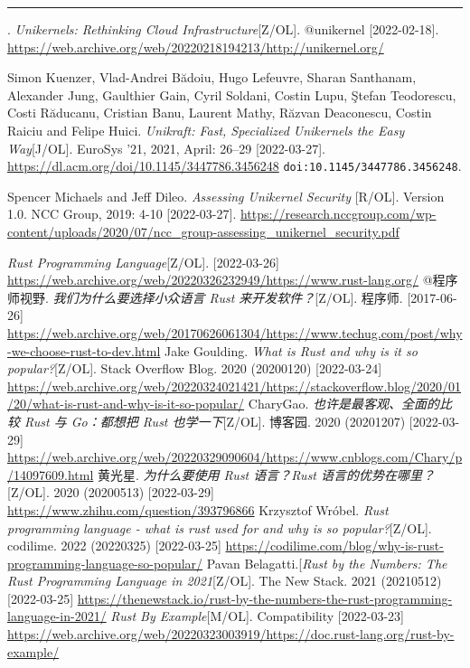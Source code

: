 \documentclass[UTF8,fontset=none,linespread=1.15]{ctexart}
\begin{document}
\begin{thebibliography}{99}
 \rule[0.5ex]{2em}{0.4pt}.
\textit{Unikernels: Rethinking Cloud Infrastructure}[Z/OL].
@unikernel [2022-02-18]. \url{https://web.archive.org/web/20220218194213/http://unikernel.org/}

 Simon Kuenzer, Vlad-Andrei Bădoiu, Hugo Lefeuvre, Sharan Santhanam,
Alexander Jung, Gaulthier Gain, Cyril Soldani, Costin Lupu, \c{S}tefan Teodorescu, Costi Răducanu,
Cristian Banu, Laurent Mathy, Răzvan Deaconescu, Costin Raiciu and Felipe Huici.
\textit{Unikraft: Fast, Specialized Unikernels the Easy Way}[J/OL]. EuroSys '21, 2021, April: 26–29
[2022-03-27]. \url{https://dl.acm.org/doi/10.1145/3447786.3456248} \texttt{doi:10.1145/3447786.3456248}.

 Spencer Michaels and Jeff Dileo. \textit{Assessing Unikernel Security
}[R/OL]. Version 1.0. NCC Group, 2019: 4-10 [2022-03-27].
\url{https://research.nccgroup.com/wp-content/uploads/2020/07/ncc_group-assessing_unikernel_security.pdf}

 \textit{Rust Programming Language}[Z/OL]. [2022-03-26] \url{https://web.archive.org/web/20220326232949/https://www.rust-lang.org/}
 @程序师视野. \textit{我们为什么要选择小众语言 Rust 来开发软件？}[Z/OL]. 程序师. [2017-06-26] \url{https://web.archive.org/web/20170626061304/https://www.techug.com/post/why-we-choose-rust-to-dev.html}
Jake Goulding. \textit{What is Rust and why is it so popular?}[Z/OL]. Stack Overflow Blog. 2020 (20200120) [2022-03-24] \url{https://web.archive.org/web/20220324021421/https://stackoverflow.blog/2020/01/20/what-is-rust-and-why-is-it-so-popular/}
 CharyGao. \textit{也许是最客观、全面的比较 Rust 与 Go：都想把 Rust 也学一下}[Z/OL]. 博客园. 2020 (20201207) [2022-03-29] \url{https://web.archive.org/web/20220329090604/https://www.cnblogs.com/Chary/p/14097609.html}
 黄光星. \textit{为什么要使用 Rust 语言？Rust 语言的优势在哪里？}[Z/OL].
2020 (20200513) [2022-03-29] \url{https://www.zhihu.com/question/393796866}
 Krzysztof Wróbel. \textit{Rust programming language - what is rust used for and why is so popular?}[Z/OL]. codilime. 2022 (20220325) [2022-03-25] \url{https://codilime.com/blog/why-is-rust-programming-language-so-popular/}
 Pavan Belagatti.[\textit{Rust by the Numbers: The Rust Programming Language in 2021}[Z/OL]. The New Stack. 2021 (20210512) [2022-03-25] \url{https://thenewstack.io/rust-by-the-numbers-the-rust-programming-language-in-2021/}
 \textit{Rust By Example}[M/OL]. Compatibility [2022-03-23] \url{https://web.archive.org/web/20220323003919/https://doc.rust-lang.org/rust-by-example/}


\end{thebibliography}
\end{document}
